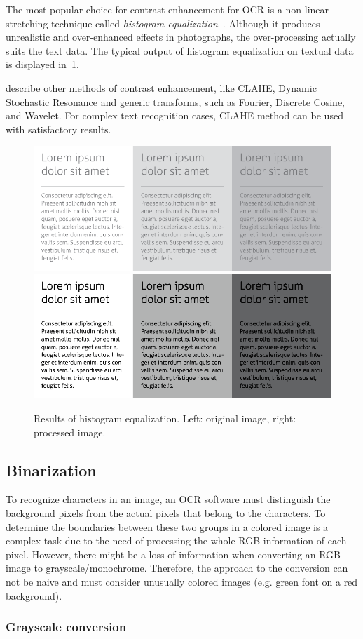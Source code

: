 The most popular choice for contrast enhancement for OCR is a non-linear stretching technique called \emph{histogram equalization}~\citep{histogramEQ}. Although it produces unrealistic and over-enhanced effects in photographs, the over-processing actually suits the text data. The typical output of histogram equalization on textual data is displayed in~\cref{fig:preprocessHistogramEqualization}.

\citet{contrastOther} describe other methods of contrast enhancement, like CLAHE, Dynamic Stochastic Resonance and generic transforms, such as Fourier, Discrete Cosine, and Wavelet. For complex text recognition cases, CLAHE method can be used with satisfactory results.

\begin{figure}[t]
\centering
\includegraphics[width=0.4\linewidth]{img/preprocessing/contrast_low.png}
\qquad
\includegraphics[width=0.4\linewidth]{img/preprocessing/contrast_high.png}
\caption{Results of histogram equalization. Left: original image, right: processed image.}
\label{fig:preprocessHistogramEqualization}
\end{figure}

\subsection{Binarization} \label{binarization}

To recognize characters in an image, an OCR software must distinguish the background pixels from the actual pixels that belong to the characters. To determine the boundaries between these two groups in a colored image is a complex task due to the need of processing the whole RGB information of each pixel. However, there might be a loss of information when converting an RGB image to grayscale/monochrome. Therefore, the approach to the conversion can not be naive and must consider unusually colored images (e.g. green font on a red background).

\subsubsection{Grayscale conversion} \label{grayscaleConversion}

